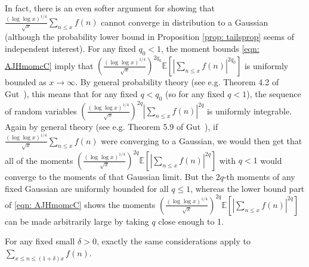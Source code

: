 \documentclass[12pt, notitlepage]{amsart}
\numberwithin{equation}{section}
\def\E{\mathbb E}
\theoremstyle{remark}
\theoremstyle{definition}
\theoremstyle{remark}
\numberwithin{equation}{section}
\begin{document}
\vspace{12pt}
In fact, there is an even softer argument for showing that $\frac{(\log \log x)^{1/4}}{\sqrt{x}} \sum_{n \leq x} f(n)$ cannot converge in distribution to a Gaussian (although the probability lower bound in Proposition \ref{prop: tailsprop} seems of independent interest). For any fixed $q_0 < 1$, the moment bounds \eqref{eqn: AJHmomcC} imply that $(\frac{(\log\log x)^{1/4}}{\sqrt{x}})^{2q_0} \E[|\sum_{n \leq x} f(n)|^{2q_0}]$ is uniformly bounded as $x \rightarrow \infty$. By general probability theory (see e.g. Theorem 4.2 of Gut~\cite{Gut}), this means that for any fixed $q < q_0$ (so for any fixed $q < 1$), the sequence of random variables $(\frac{(\log\log x)^{1/4}}{\sqrt{x}})^{2q} |\sum_{n \leq x} f(n)|^{2q}$ is uniformly integrable. Again by general theory (see e.g. Theorem 5.9 of Gut~\cite{Gut}), if $\frac{(\log \log x)^{1/4}}{\sqrt{x}} \sum_{n \leq x} f(n)$ were converging to a Gaussian, we would then get that all of the moments $(\frac{(\log\log x)^{1/4}}{\sqrt{x}})^{2q} \E[|\sum_{n \leq x} f(n)|^{2q}]$ with $q < 1$ would converge to the moments of that Gaussian limit. But the $2q$-th moments of any fixed Gaussian are uniformly bounded for all $q \leq 1$, whereas the lower bound part of \eqref{eqn: AJHmomcC} shows the moments $(\frac{(\log\log x)^{1/4}}{\sqrt{x}})^{2q} \E[|\sum_{n \leq x} f(n)|^{2q}]$ can be made arbitrarily large by taking $q$ close enough to 1.

For any fixed small $\delta > 0$, exactly the same considerations apply to $\sum_{x \leq n \leq (1+\delta)x} f(n)$.
  
{}
\end{document}

